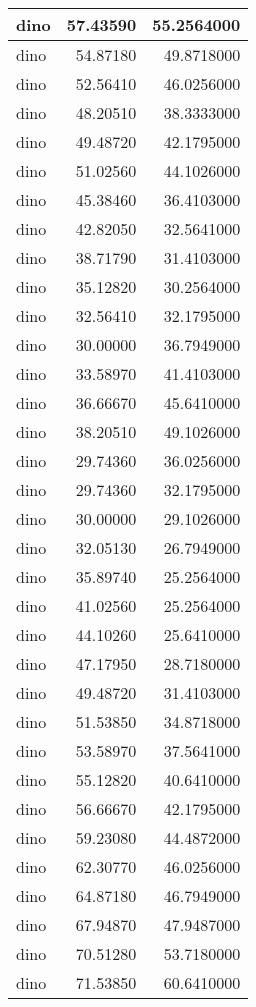 \documentclass[
]{book}
\theoremstyle{definition}
\theoremstyle{definition}
\theoremstyle{definition}
\theoremstyle{definition}
\theoremstyle{remark}
\begin{document}
\begin{tabular}{l|r|r}
\hline
dino & 57.43590 & 55.2564000\\
\hline
dino & 54.87180 & 49.8718000\\
\hline
dino & 52.56410 & 46.0256000\\
\hline
dino & 48.20510 & 38.3333000\\
\hline
dino & 49.48720 & 42.1795000\\
\hline
dino & 51.02560 & 44.1026000\\
\hline
dino & 45.38460 & 36.4103000\\
\hline
dino & 42.82050 & 32.5641000\\
\hline
dino & 38.71790 & 31.4103000\\
\hline
dino & 35.12820 & 30.2564000\\
\hline
dino & 32.56410 & 32.1795000\\
\hline
dino & 30.00000 & 36.7949000\\
\hline
dino & 33.58970 & 41.4103000\\
\hline
dino & 36.66670 & 45.6410000\\
\hline
dino & 38.20510 & 49.1026000\\
\hline
dino & 29.74360 & 36.0256000\\
\hline
dino & 29.74360 & 32.1795000\\
\hline
dino & 30.00000 & 29.1026000\\
\hline
dino & 32.05130 & 26.7949000\\
\hline
dino & 35.89740 & 25.2564000\\
\hline
dino & 41.02560 & 25.2564000\\
\hline
dino & 44.10260 & 25.6410000\\
\hline
dino & 47.17950 & 28.7180000\\
\hline
dino & 49.48720 & 31.4103000\\
\hline
dino & 51.53850 & 34.8718000\\
\hline
dino & 53.58970 & 37.5641000\\
\hline
dino & 55.12820 & 40.6410000\\
\hline
dino & 56.66670 & 42.1795000\\
\hline
dino & 59.23080 & 44.4872000\\
\hline
dino & 62.30770 & 46.0256000\\
\hline
dino & 64.87180 & 46.7949000\\
\hline
dino & 67.94870 & 47.9487000\\
\hline
dino & 70.51280 & 53.7180000\\
\hline
dino & 71.53850 & 60.6410000\\

\end{tabular}
\end{document}
